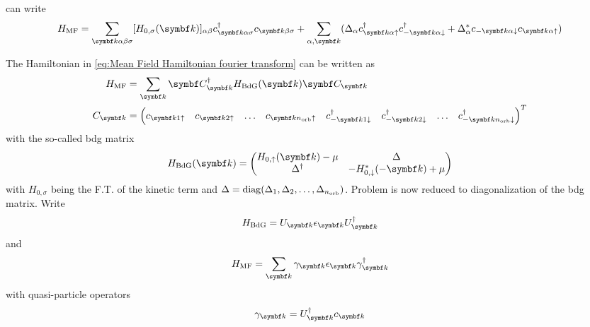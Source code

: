 \documentclass[../notes.tex]{subfiles}
\begin{document}
can write
\begin{align}
	H_{\mathrm{MF}} = \sum_{\vb{k} \alpha \beta \sigma} [H_{0, \sigma} (\vb{k})]_{\alpha \beta} c_{\vb{k} \alpha \sigma}^{\dagger} c_{\vb{k} \beta \sigma}
	+ \sum_{\alpha, \vb{k}} (\Delta_{\alpha} c_{\vb{k} \alpha \uparrow}^{\dagger} c_{-\vb{k} \alpha \downarrow}^{\dagger} + \Delta_{\alpha}^* c_{-\vb{k} \alpha \downarrow} c_{\vb{k} \alpha \uparrow})
	\label{eq:Mean Field Hamiltonian fourier transform}
\end{align}

The Hamiltonian in \cref{eq:Mean Field Hamiltonian fourier transform} can be written as 
\begin{align}
	H_{\mathrm{MF}} &= \sum_{\vb{k}} \vb{C}_{\vb{k}}^{\dagger} H_{\mathrm{BdG}} (\vb{k}) \vb{C}_{\vb{k}} \\
	C_{\vb{k}} &= 
		\begin{pmatrix}
			c_{\vb{k} 1 \uparrow} & 
			c_{\vb{k} 2 \uparrow} &
			\ldots &
			c_{\vb{k} n_{\mathrm{orb}} \uparrow} &
			c_{-\vb{k} 1 \downarrow}^{\dagger} &
			c_{-\vb{k} 2 \downarrow}^{\dagger} &
			\ldots &
			c_{-\vb{k} n_{\mathrm{orb}} \downarrow}^{\dagger}
		\end{pmatrix}^{T}
\end{align}
with the so-called \acrfull{bdg} matrix
\begin{equation}
	H_{\mathrm{BdG}} (\vb{k}) =
	\begin{pmatrix}
		H_{0, \uparrow} (\vb{k}) - \mu & \Delta \\
		\Delta^{\dagger} & - H_{0, \downarrow}^* (-\vb{k}) + \mu
	\end{pmatrix}
\end{equation}
with \(H_{0, \sigma}\) being the F.T. of the kinetic term and \(\Delta = \operatorname{diag}(\Delta_1, \Delta_2, \ldots, \Delta_{n_{\mathrm{orb}}})\).
Problem is  now reduced to diagonalization of the \acrshort{bdg} matrix.
Write
\begin{equation}
	H_{\mathrm{BdG}} = U_{\vb{k}} \epsilon_{\vb{k}} U_{\vb{k}}^{\dagger}
\end{equation}
and 
\begin{equation}
	H_{\mathrm{MF}} = \sum_{\vb{k}} \gamma_{\vb{k}} \epsilon_{\vb{k}} \gamma_{\vb{k}}^{\dagger}
\end{equation}
with quasi-particle operators
\begin{equation}
	\gamma_{\vb{k}} = U_{\vb{k}}^{\dagger} c_{\vb{k}}
\end{equation}
\end{document}
